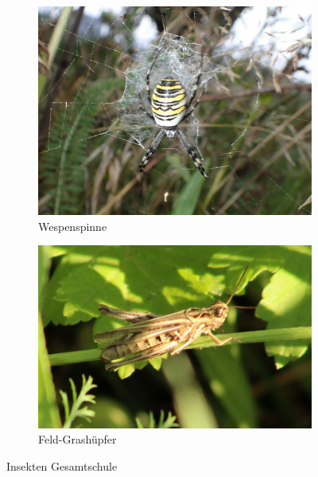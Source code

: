 \documentclass[10pt]{article}
\begin{document}
\begin{figure}[h!]
  \centering
  \begin{subfigure}[b]{0.34\linewidth}
    \includegraphics[width=\linewidth]{img/gesamtschule/wespenspinne.jpg}
    \caption{Wespenspinne}
  \end{subfigure}
  \begin{subfigure}[b]{0.38\linewidth}
    \includegraphics[width=\linewidth]{img/gesamtschule/grashuepfer.jpg}
    \caption{Feld-Grashüpfer}
  \end{subfigure}
  \caption{Insekten Gesamtschule}
\end{figure}

\clearpage
\end{document}
